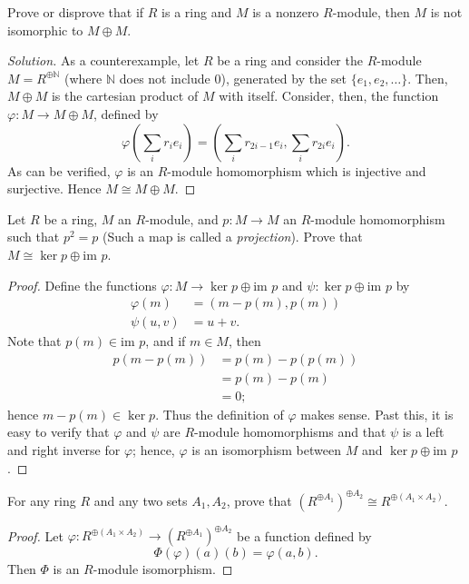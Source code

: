 \documentclass[12pt]{article}
\newenvironment{problem}[2][Problem]{\begin{trivlist}
\item[\hskip \labelsep {\bfseries #1}\hskip \labelsep {\bfseries #2.}]}{\end{trivlist}}
\newcommand{\im}{\text{im }}
\newcommand{\N}{\mathbb{N}}
\newenvironment{solution}
  {\renewcommand\qedsymbol{$\blacksquare$}\begin{proof}[Solution]}
{\end{proof}}
\theoremstyle{remark}
\begin{document}
\begin{problem}{6.2}
  Prove or disprove that if $R$ is a ring and $M$ is a nonzero $R$-module,
  then $M$ is not isomorphic to $M\oplus M$.
\end{problem}
\begin{solution}
  As a counterexample, let $R$ be a ring and consider the $R$-module
  $M=R^{\oplus\N}$ (where $\N$ does not include 0), generated by
  the set $\{e_1,e_2,\dots\}$.
  Then, $M\oplus M$ is the cartesian product of $M$ with itself.
  Consider, then, the function $\varphi:M\to M\oplus M$, defined by
  \begin{equation*}
    \varphi\left( \sum_i r_ie_i \right)
    = \left( \sum_i r_{2i-1}e_i, \sum_i r_{2i}e_i \right).
  \end{equation*}
  As can be verified, $\varphi$ is an $R$-module homomorphism which is
  injective and surjective.
  Hence $M\cong M\oplus M$.
\end{solution}

\begin{problem}{6.3}
  Let $R$ be a ring, $M$ an $R$-module, and $p:M\to M$ an $R$-module
  homomorphism such that $p^2=p$ (Such a map is called a \textit{projection}).
  Prove that $M\cong\ker p\oplus\im p$.
\end{problem}
\begin{proof}
  Define the functions $\varphi:M\to\ker p\oplus\im p$
  and $\psi:\ker p\oplus\im p$ by 
  \begin{align*}
    \varphi(m) &= (m-p(m), p(m)) \\
    \psi(u,v) &= u + v.
  \end{align*}
  Note that $p(m)\in\im p$, and if $m\in M$, then 
  \begin{align*}
    p(m-p(m)) &= p(m)-p(p(m))  \\
    &= p(m)-p(m) \\
    &= 0;
  \end{align*}
  hence $m-p(m)\in \ker p$.
  Thus the definition of $\varphi$ makes sense.
  Past this, it is easy to verify that $\varphi$ and $\psi$ are
  $R$-module homomorphisms and that $\psi$ is a left and right inverse
  for $\varphi$; hence, $\varphi$ is an isomorphism between $M$
  and $\ker p\oplus\im p$.
\end{proof}

\begin{problem}{6.5}
  For any ring $R$ and any two sets $A_1,A_2$, prove that
  $\left(R^{\oplus A_1}\right)^{\oplus A_2}
  \cong R^{\oplus(A_1\times A_2)}$.
\end{problem}
\begin{proof}
  Let $\varphi: R^{\oplus(A_1\times A_2)}
  \to \left(R^{\oplus A_1}\right)^{\oplus A_2}$ be a function defined by 
  \begin{equation*}
    \Phi(\varphi)(a)(b) = \varphi(a,b).
  \end{equation*}
  Then $\Phi$ is an $R$-module isomorphism.
\end{proof}
\end{document}
